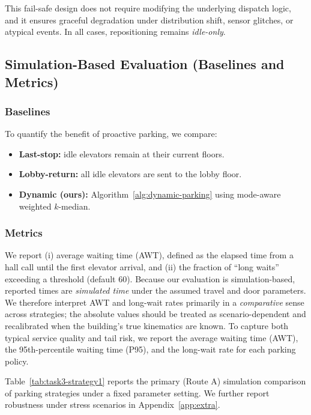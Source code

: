 This fail-safe design does not require modifying the underlying dispatch logic, and it ensures graceful degradation under distribution shift,
sensor glitches, or atypical events. In all cases, repositioning remains \emph{idle-only}.


\subsection{Simulation-Based Evaluation (Baselines and Metrics)}

\subsubsection{Baselines}
To quantify the benefit of proactive parking, we compare:
\begin{itemize}
    \item \textbf{Last-stop:} idle elevators remain at their current floors.
    \item \textbf{Lobby-return:} all idle elevators are sent to the lobby floor.
    \item \textbf{Dynamic (ours):} Algorithm~\ref{alg:dynamic-parking} using mode-aware weighted $k$-median.
\end{itemize}

\subsubsection{Metrics}
We report (i) average waiting time (AWT), defined as the elapsed time from a hall call until the first elevator arrival, and
(ii) the fraction of ``long waits'' exceeding a threshold (default 60). Because our evaluation is simulation-based, reported times are
\emph{simulated time} under the assumed travel and door parameters. We therefore interpret AWT and long-wait rates primarily in a
\emph{comparative} sense across strategies; the absolute values should be treated as scenario-dependent and recalibrated when the
building's true kinematics are known.
To capture both typical service quality and tail risk, we report the average waiting time (AWT), the 95th-percentile waiting time (P95), and the long-wait rate for each parking policy.

Table~\ref{tab:task3-strategy1} reports the primary (Route A) simulation comparison of parking strategies under a fixed parameter setting.
% 
We further report robustness under stress scenarios in Appendix~\ref{app:extra}.




